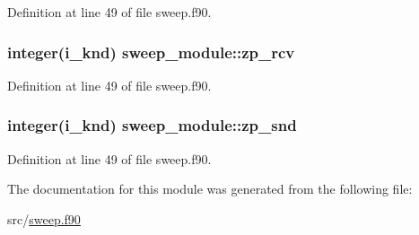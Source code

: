 Definition at line 49 of file sweep.\-f90.

\hypertarget{classsweep__module_a2e606e13d5d6df88605a757235d90f15}{
\subsubsection[{zp\-\_\-rcv}]{\setlength{\rightskip}{0pt plus 5cm}integer(i\-\_\-knd) sweep\-\_\-module\-::zp\-\_\-rcv\hspace{0.3cm}{\ttfamily [private]}}}\label{classsweep__module_a2e606e13d5d6df88605a757235d90f15}


Definition at line 49 of file sweep.\-f90.

\hypertarget{classsweep__module_a5d8635df65a44c026ab27c08910d91d8}{
\subsubsection[{zp\-\_\-snd}]{\setlength{\rightskip}{0pt plus 5cm}integer(i\-\_\-knd) sweep\-\_\-module\-::zp\-\_\-snd\hspace{0.3cm}{\ttfamily [private]}}}\label{classsweep__module_a5d8635df65a44c026ab27c08910d91d8}


Definition at line 49 of file sweep.\-f90.



The documentation for this module was generated from the following file\-:\begin{DoxyCompactItemize}
\item 
src/\hyperlink{sweep_8f90}{sweep.\-f90}\end{DoxyCompactItemize}
